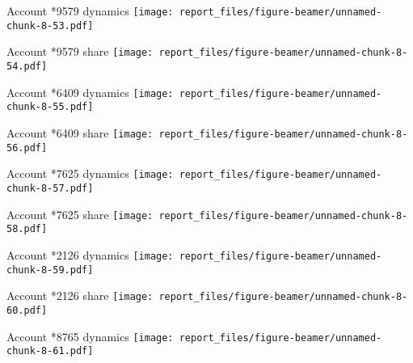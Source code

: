 \documentclass[ignorenonframetext,]{beamer}
\begin{document}
\begin{frame}{Account *9579 dynamics
\texttt{[image: report\_files/figure-beamer/unnamed-chunk-8-53.pdf]}}
\protect\hypertarget{account-9579-dynamics}{}

\end{frame}

\begin{frame}{Account *9579 share
\texttt{[image: report\_files/figure-beamer/unnamed-chunk-8-54.pdf]}}
\protect\hypertarget{account-9579-share}{}

\end{frame}

\begin{frame}{Account *6409 dynamics
\texttt{[image: report\_files/figure-beamer/unnamed-chunk-8-55.pdf]}}
\protect\hypertarget{account-6409-dynamics}{}

\end{frame}

\begin{frame}{Account *6409 share
\texttt{[image: report\_files/figure-beamer/unnamed-chunk-8-56.pdf]}}
\protect\hypertarget{account-6409-share}{}

\end{frame}

\begin{frame}{Account *7625 dynamics
\texttt{[image: report\_files/figure-beamer/unnamed-chunk-8-57.pdf]}}
\protect\hypertarget{account-7625-dynamics}{}

\end{frame}

\begin{frame}{Account *7625 share
\texttt{[image: report\_files/figure-beamer/unnamed-chunk-8-58.pdf]}}
\protect\hypertarget{account-7625-share}{}

\end{frame}

\begin{frame}{Account *2126 dynamics
\texttt{[image: report\_files/figure-beamer/unnamed-chunk-8-59.pdf]}}
\protect\hypertarget{account-2126-dynamics}{}

\end{frame}

\begin{frame}{Account *2126 share
\texttt{[image: report\_files/figure-beamer/unnamed-chunk-8-60.pdf]}}
\protect\hypertarget{account-2126-share}{}

\end{frame}

\begin{frame}{Account *8765 dynamics
\texttt{[image: report\_files/figure-beamer/unnamed-chunk-8-61.pdf]}}
\protect\hypertarget{account-8765-dynamics}{}

\end{frame}
\end{document}
